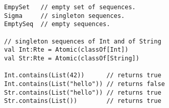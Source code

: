 \begin{lstlisting}[style=reclojureScala]
EmpySet   // empty set of sequences.
Sigma     // singleton sequences.
EmptySeq  // empty sequences.

// singleton sequences of Int and of String
val Int:Rte = Atomic(classOf[Int])    
val Str:Rte = Atomic(classOf[String])

Int.contains(List(42))      // returns true
Int.contains(List("hello")) // returns false
Str.contains(List("hello")) // returns true
Str.contains(List())        // returns true
\end{lstlisting}
